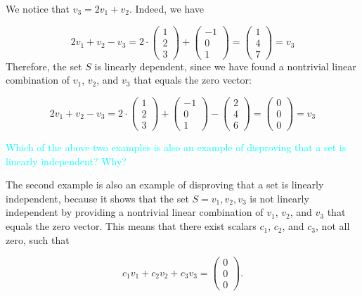 \documentclass[fontsize=12pt]{scrartcl}
\begin{document}
\noindent
We notice that $v_3 = 2v_1 + v_2$. Indeed, we have

$$2v_1 + v_2 - v_3 = 2\cdot \left(\begin{array}{c} 1 \\ 2 \\ 3 \end{array} \right) + \left(\begin{array}{c} -1 \\ 0 \\1 \end{array} \right) = \left(\begin{array}{c} 1 \\ 4 \\7 \end{array} \right) = v_3$$
\noindent
Therefore, the set $S$ is linearly dependent, since we have found a nontrivial linear combination of $v_1$, $v_2$, and $v_3$ that equals the zero vector:

$$2v_1 + v_2 - v_3 = 2\cdot \left(\begin{array}{c} 1 \\ 2 \\ 3 \end{array} \right) + \left(\begin{array}{c} -1 \\ 0 \\1 \end{array} \right) - \left(\begin{array}{c} 2 \\ 4 \\6 \end{array} \right) = \left(\begin{array}{c} 0 \\ 0 \\0 \end{array} \right) = v_3$$

\noindent
\textcolor{cyan}{Which of the above two examples is also an example of disproving that a set is linearly independent? Why?}

\noindent
The second example is also an example of disproving that a set is linearly independent, because it shows that the set $S = {v_1, v_2, v_3}$ is not linearly independent by providing a nontrivial linear combination of $v_1$, $v_2$, and $v_3$ that equals the zero vector. This means that there exist scalars $c_1$, $c_2$, and $c_3$, not all zero, such that

$$c_1v_1+c_2v_2+c_3v_3 = \left(\begin{array}{c} 0 \\ 0 \\ 0
\end{array} \right).$$
\end{document}
